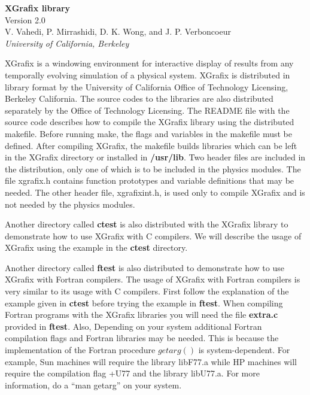 \pagestyle{plain}
\topmargin -0.60in
\oddsidemargin 0.0625in
\textheight 9.00in
\textwidth 6.50in
\renewcommand{\baselinestretch}{1.4}
\parskip 0.10in



\begin{center}
\Large
{\bf XGrafix library} \\
Version 2.0
\\
\large
V. Vahedi, P. Mirrashidi, D. K. Wong, and J. P. Verboncoeur \\
{\em University of California, Berkeley}
\end{center}

\normalsize
XGrafix is a windowing environment for interactive display of
results from any temporally evolving simulation of a physical
system.  XGrafix is distributed in library format by the University
of California Office of Technology Licensing, Berkeley California.
The source codes to the libraries are also distributed separately
by the Office of Technology Licensing.  The README file with the
source code describes how to compile the XGrafix library using
the distributed makefile.  Before running make, the flags and
variables in the makefile must be defined. After compiling XGrafix,
the makefile builds libraries which can be left in the XGrafix
directory or installed in {\bf /usr/lib}.  Two header files are
included in the distribution, only one of which is to be included
in the physics modules.  The file xgrafix.h contains function prototypes
and variable definitions that may be needed.  The other header file, 
xgrafixint.h, is used only to compile XGrafix and is not needed by 
the physics modules.

Another directory called {\bf ctest} is also
distributed with the XGrafix library to demonstrate how to use
XGrafix with C compilers. We will
describe the usage of XGrafix using the example in the {\bf ctest}
directory.

Another directory called {\bf ftest} is also distributed to
demonstrate how to use XGrafix with Fortran compilers. 
The usage of XGrafix with Fortran compilers is very similar
to its usage with C compilers. First follow the
explanation of the example given in {\bf ctest} before
trying the example in {\bf ftest}. When compiling Fortran programs with
the XGrafix libraries you will need the file {\bf extra.c} provided in {\bf ftest}.
Also, Depending on your system additional Fortran compilation flags and Fortran
libraries may be needed. This is because the implementation of the Fortran 
procedure $getarg()$ is system-dependent. For example, Sun machines will require
the library libF77.a while HP machines will require the compilation flag +U77 and
the library libU77.a. For more information, do a ``man getarg'' on your system. 


